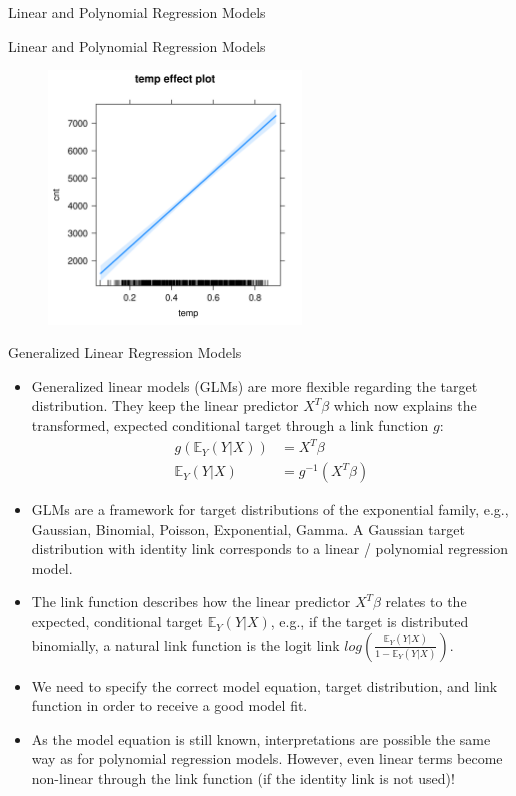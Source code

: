 \documentclass[11pt,compress,t,notes=noshow, xcolor=table]{beamer}
\begin{document}
\begin{vbframe}{Linear and Polynomial Regression Models}
\tiny

\end{vbframe}

\begin{vbframe}{Linear and Polynomial Regression Models}
\begin{figure}
  \includegraphics[width = 0.6\textwidth]{figure/lm_effect_plot.png}
\end{figure}
\end{vbframe}


\begin{vbframe}{Generalized Linear Regression Models}

\begin{itemize}
\setlength\itemsep{2em}
\item Generalized linear models (GLMs) are more flexible regarding the target distribution. They keep the linear predictor $X^T\beta$ which now explains the transformed, expected conditional target through a link function $g$: 
\begin{align*}
g\left(\mathbb{E}_Y(Y \vert X)\right) &= X^T\beta \\
\mathbb{E}_Y \left(Y \vert X\right) &= g^{-1}(X^T\beta) 
\end{align*}
\item GLMs are a framework for target distributions of the exponential family, e.g., Gaussian, Binomial, Poisson, Exponential, Gamma. A Gaussian target distribution with identity link corresponds to a linear / polynomial regression model.
\item The link function describes how the linear predictor $X^T\beta$ relates to the expected, conditional target $\mathbb{E}_Y(Y \vert X)$, e.g., if the target is distributed binomially, a natural link function is the logit link $log\left(\frac{\mathbb{E}_Y(Y \vert X)}{1 - \mathbb{E}_Y(Y \vert X)}\right)$.
\item We need to specify the correct model equation, target distribution, and link function in order to receive a good model fit.
\item As the model equation is still known, interpretations are possible the same way as for polynomial regression models. However, even linear terms become non-linear through the link function (if the identity link is not used)!
\end{itemize}
\end{vbframe}
\end{document}
